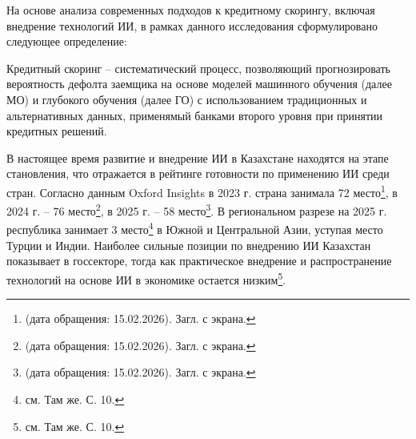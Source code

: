 На основе анализа современных подходов к кредитному скорингу, включая внедрение технологий ИИ, в рамках данного исследования сформулировано следующее определение:

Кредитный скоринг -- систематический процесс, позволяющий прогнозировать вероятность дефолта заемщика на основе моделей машинного обучения (далее МО) и глубокого обучения (далее ГО) с использованием традиционных и альтернативных данных, применямый банками второго уровня при принятии кредитных решений.

В настоящее время развитие и внедрение ИИ в Казахстане находятся на этапе становления, что отражается в рейтинге готовности по применению ИИ среди стран. Согласно данным Oxford Insights в 2023 г. страна занимала 72 место\footnote{\cite{Cninform} (дата обращения: 15.02.2026). Загл. с экрана.}, в 2024 г. -- 76 место\footnote{\cite{Oxford} (дата обращения: 15.02.2026). Загл. с экрана.}, в 2025 г. -- 58 место\footnote{\cite{Oxford2} (дата обращения: 15.02.2026). Загл. с экрана.}. В региональном разрезе на 2025 г. республика занимает 3 место\footnote{см. Там же. С. 10.} в Южной и Центральной Азии, уступая место Турции и Индии. Наиболее сильные позиции по внедрению ИИ Казахстан показывает в госсекторе, тогда как практическое внедрение и распространение технологий на основе ИИ в экономике остается низким\footnote{см. Там же. С. 10.}. 

